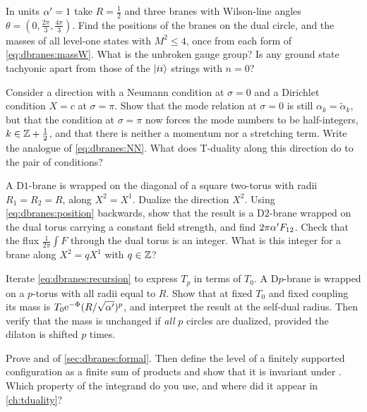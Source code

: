 \begin{exercise}[$\star$]
In units $\alpha'=1$ take $R=\frac12$ and three branes with Wilson-line angles
$\theta=(0,\frac{2\pi}3,\frac{4\pi}3)$. Find the positions of the branes on the dual circle, and the
masses of all level-one states with $M^2\le4$, once from each form of
\eqref{eq:dbranes:massW}. What is the unbroken gauge group? Is any ground state tachyonic apart
from those of the $|ii\rangle$ strings with $n=0$?
\end{exercise}

\begin{exercise}[$\star\star$]\label{ex:dbranes:ND}
Consider a direction with a Neumann condition at $\sigma=0$ and a Dirichlet condition
$X=c$ at $\sigma=\pi$. Show that the mode relation at $\sigma=0$ is still
$\alpha_k=\tilde\alpha_k$, but that the condition at $\sigma=\pi$ now forces the mode numbers to be
half-integers, $k\in\mathbb{Z}+\frac12$, and that there is neither a momentum nor a stretching term.
Write the analogue of \eqref{eq:dbranes:NN}. What does T-duality along this direction do to the
pair of conditions?
\end{exercise}

\begin{exercise}[$\star\star$]
A D$1$-brane is wrapped on the diagonal of a square two-torus with radii $R_1=R_2=R$, along
$X^2=X^1$. Dualize the direction $X^2$. Using \eqref{eq:dbranes:position} backwards, show that
the result is a D$2$-brane wrapped on the dual torus carrying a constant field strength, and
find $2\pi\alpha' F_{12}$. Check that the flux $\frac1{2\pi}\int F$ through the dual torus is an
integer. What is this integer for a brane along $X^2=qX^1$ with $q\in\mathbb{Z}$?
\end{exercise}

\begin{exercise}[$\star\star$]
Iterate \eqref{eq:dbranes:recursion} to express $T_p$ in terms of $T_0$. A D$p$-brane is wrapped on
a $p$-torus with all radii equal to $R$. Show that at fixed $T_0$ and fixed coupling its mass is
$T_0\mathrm{e}^{-\Phi}(R/\sqrt{\alpha'})^p$, and interpret the result at the self-dual radius. Then verify
that the mass is unchanged if \emph{all} $p$ circles are dualized, provided the dilaton is shifted
$p$ times.
\end{exercise}

\begin{exercise}
Prove  and  of
\cref{sec:dbranes:formal}. Then define the level of a finitely supported configuration as a
finite sum of products  and show that it is invariant under
. Which property of the integrand do you use, and where did it appear in
\cref{ch:tduality}?
\end{exercise}

